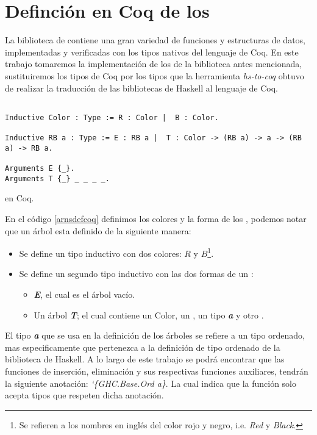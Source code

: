 \section{Definci\'on en Coq de los {\arns}}

La biblioteca de {\coq} contiene una gran variedad de funciones y estructuras de datos, 
implementadas y verificadas con los tipos nativos del lenguaje de Coq. En este trabajo
tomaremos la implementaci\'on de los {\arns} de la biblioteca antes mencionada, 
sustituiremos los tipos de Coq por los tipos que la herramienta \textit{hs-to-coq} obtuvo
de realizar la traducci\'on de las bibliotecas de Haskell al lenguaje de Coq.

\begin{listing}[!ht]
\centering
\captionsetup{justification=centering}
\begin{verbatim}

Inductive Color : Type := R : Color |  B : Color.

Inductive RB a : Type := E : RB a |  T : Color -> (RB a) -> a -> (RB a) -> RB a.

Arguments E {_}.
Arguments T {_} _ _ _ _.
\end{verbatim}
\caption{{\Arns} en Coq.}
\label{arnsdefcoq}
\end{listing}

En el c\'odigo \ref{arnsdefcoq} definimos los colores y la forma de los {\arns}, podemos notar que un \'arbol esta definido de la siguiente manera:
\begin{itemize}
    \item Se define un tipo inductivo con dos colores: $R$ y $B$\footnote{Se refieren a los nombres en ingl\'es del color rojo y negro, i.e. \textit{Red} y \textit{Black}.}.
    \item Se define un segundo tipo inductivo con las dos formas de un {\arn}:
    \begin{itemize}
        \item \textit{\textbf{E}}, el cual es el \'arbol vacío.
        \item Un \'arbol \textit{\textbf{T}}; el cual contiene un Color, un {\arn}, un tipo \textit{\textbf{a}} y otro {\arn}.
    \end{itemize}
\end{itemize}

El tipo \textit{\textbf{a}} que se usa en la definici\'on de los \'arboles se refiere a 
un tipo ordenado, mas especificamente que pertenezca a la definici\'on de tipo ordenado 
de la biblioteca de Haskell\cite{orderings}. A lo largo de este trabajo se podr\'a 
encontrar que las funciones de inserci\'on, eliminaci\'on y sus respectivas funciones 
auxiliares, tendr\'an la siguiente anotaci\'on: \textit{`\{GHC.Base.Ord a\}}. La cual 
indica que la funci\'on solo acepta tipos que respeten dicha anotaci\'on.


